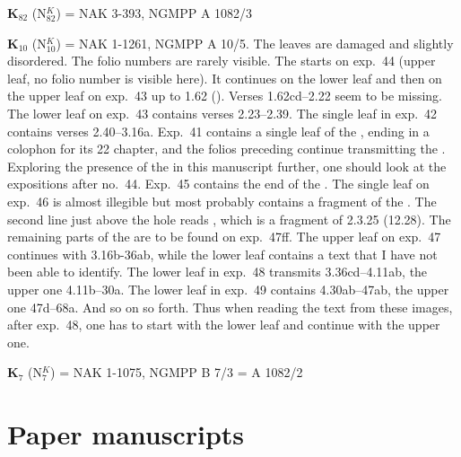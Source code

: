 \documentclass[11pt]{article} %
\begin{document}
{%
{\large \textbf{K$_{\scriptscriptstyle 82}$}
(N$^{\scriptscriptstyle K}_{\scriptscriptstyle 82}$) =
NAK 3-393, NGMPP A 1082/3
\bigskip


{\large \textbf{K$_{\scriptscriptstyle 10}$}
(N$^{\scriptscriptstyle K}_{\scriptscriptstyle 10}$) =
NAK 1-1261, NGMPP A 10/5. 
The leaves are damaged and slightly disordered. The folio numbers are rarely visible.
The  starts on exp.\ 44 (upper leaf, no folio number is visible here).
It continues on the lower leaf and then on the upper leaf on exp.\ 43
up to 1.62 (). 
Verses 1.62cd--2.22 seem to be missing.
The lower leaf on exp.\ 43 contains verses 2.23--2.39.
The single leaf in exp.\ 42 contains verses 2.40--3.16a.
Exp.\ 41 contains a single leaf of the ,
ending in a colophon for its 22 chapter, 
and the folios preceding continue transmitting the .
Exploring the presence of the  in 
this manuscript further, one should look at the expositions after no.\ 44.
Exp.\ 45 contains the end of the .
The single leaf on exp.\ 46 is almost illegible but most probably contains
a fragment of the . The second line just above the hole
reads ,
which is a fragment of  2.3.25 (12.28).
The remaining parts of the  are to be found 
on exp.\ 47ff. The upper leaf on exp.\ 47 continues with  3.16b-36ab,
while the lower leaf contains a text that I have not been able to identify.
The lower leaf in exp.\ 48 transmits 3.36cd--4.11ab, the upper one 4.11b--30a.
The lower leaf in exp.\ 49 contains 4.30ab--47ab, the upper one 47d--68a. And so on so forth.
Thus when reading the text from these images, after exp.\ 48, 
one has to start with the lower leaf and continue with the upper one. 

\bigskip



{\large \textbf{K$_{\scriptscriptstyle 7}$}
(N$^{\scriptscriptstyle K}_{\scriptscriptstyle 7}$) =
NAK 1-1075, NGMPP B 7/3 = A 1082/2





\section{Paper manuscripts}

}}}}
\end{document}

